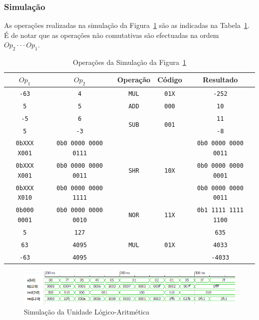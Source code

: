 \documentclass[a4paper]{article}
\begin{document}
\subsubsection{Simulação}
As operações realizadas na simulação da Figura~\ref{fig:ALUsim} são as indicadas na Tabela~\ref{tab:ALUsim}. É de notar que as operações não comutativas são efectuadas na ordem $ Op_2 \cdot \cdot \cdot Op_1 $.
\begin{table}[h]
	\begin{tabular}{|c | c || c | c | c|}
		\hline
		$Op_1$ & $Op_2$ & Operação & Código & Resultado \\
		\hline
		\texttt{-63} & \texttt{4} & \texttt{MUL} & \texttt{01X} & \texttt{-252} \\
		\hline
		\texttt{5} & \texttt{5} & \texttt{ADD} & \texttt{000} & \texttt{10} \\
		\hline
		\texttt{-5} & \texttt{6} & \multirow{2}{*}{\texttt{SUB}} & \multirow{2}{*}{\texttt{001}} & \texttt{11} \\
		\texttt{5} & \texttt{-3} & & & \texttt{-8} \\
		\hline
		\texttt{0bXXX X001} & \texttt{0b0 0000 0000 0111} & \multirow{3}{*}{\texttt{SHR}} & \multirow{3}{*}{\texttt{10X}} & \texttt{0b0 0000 0000 0011} \\
		\texttt{0bXXX X001} & \texttt{0b0 0000 0000 0011} & & & \texttt{0b0 0000 0000 0001} \\
		\texttt{0bXXX X010} & \texttt{0b0 0000 0000 1111} & & & \texttt{0b0 0000 0000 0011} \\
		\hline
		\texttt{0b000 0001} & \texttt{0b0 0000 0000 0010} & \texttt{NOR} & \texttt{11X} & \texttt{0b1 1111 1111 1100} \\
		\hline
		\texttt{5} & \texttt{127} & \multirow{3}{*}{\texttt{MUL}} & \multirow{3}{*}{\texttt{01X}} & \texttt{635} \\
		\texttt{63} & \texttt{4095} & & & \texttt{4033} \\
		\texttt{-63} & \texttt{4095} & & & \texttt{-4033} \\
		\hline
	\end{tabular}
	\caption{Operações da Simulação da Figura~\ref{fig:ALUsim}}
        \label{tab:ALUsim}
\end{table}

\begin{figure}[h]
	\centering
	\includegraphics[width=\textwidth]{ALU_sim}
	\caption{Simulação da Unidade Lógico-Aritmética}
	\label{fig:ALUsim}
\end{figure}
\pagebreak
\end{document}
